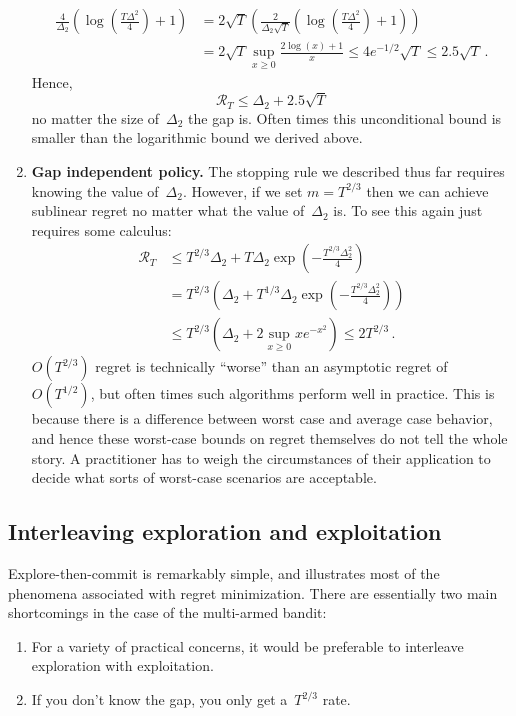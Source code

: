 \documentclass{tufte-book}
\begin{document}
\begin{enumerate}
\[\begin{aligned}
  \frac{4}{\Delta_2} \left(\log \left(\frac{T \Delta^2}{4}\right)+1\right)
  & = 2\sqrt{T} \left( \frac{2}{\Delta_2\sqrt{T}} \left(\log \left(\frac{T \Delta^2}{4}\right)+1\right)   \right)\\
  & = 2\sqrt{T} \sup_{x\geq 0} \frac{2\log(x)+1}{x} \leq 4 e^{-1/2} \sqrt{T} \leq 2.5 \sqrt{T} \,.
  \end{aligned}
  \] Hence, \[
  \mathcal{R}_T \leq \Delta_2 + 2.5 \sqrt{T}
  \] no matter the size of~\(\Delta_2\) the gap is. Often times this
  unconditional bound is smaller than the logarithmic bound we derived
  above.
\item
  \textbf{Gap independent policy.} The stopping rule we described thus
  far requires knowing the value of~\(\Delta_2\). However, if we set
  \(m=T^{2/3}\) then we can achieve sublinear regret no matter what the
  value of~\(\Delta_2\) is. To see this again just requires some
  calculus: \[
  \begin{aligned}
  \mathcal{R}_T &\leq T^{2/3}\Delta_2 + T \Delta_2 \exp\left(-\frac{T^{2/3}\Delta_2^2}{4}\right)\\
  &= T^{2/3} \left(   \Delta_2 + T^{1/3} \Delta_2 \exp\left(-\frac{T^{2/3}\Delta_2^2}{4}\right)   \right)\\
  &\leq T^{2/3} \left(   \Delta_2 + 2 \sup_{x\geq 0} x e^{-x^2} \right) \leq 2 T^{2/3}\,.
  \end{aligned}
  \] \(O(T^{2/3})\) regret is technically ``worse'' than an asymptotic
  regret of~\(O(T^{1/2})\), but often times such algorithms perform well
  in practice. This is because there is a difference between worst case
  and average case behavior, and hence these worst-case bounds on regret
  themselves do not tell the whole story. A practitioner has to weigh
  the circumstances of their application to decide what sorts of
  worst-case scenarios are acceptable.
\end{enumerate}

\hypertarget{interleaving-exploration-and-exploitation}{%
\subsection{Interleaving exploration and
exploitation}\label{interleaving-exploration-and-exploitation}}

Explore-then-commit is remarkably simple, and illustrates most of the
phenomena associated with regret minimization. There are essentially two
main shortcomings in the case of the multi-armed bandit:

\begin{enumerate}
\def\labelenumi{\arabic{enumi}.}
\item
  For a variety of practical concerns, it would be preferable to
  interleave exploration with exploitation.
\item
  If you don't know the gap, you only get a~\(T^{2/3}\) rate.
\end{enumerate}
\end{document}
